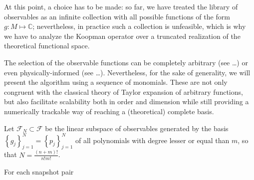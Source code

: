 \documentclass{article}
\begin{document}
        At this point, a choice has to be made: so far, we have treated the library of observables as an infinite collection with all possible functions of the form $g:M \mapsto \mathbb{C}$; nevertheless, in practice such a collection is unfeasible, which is why we have to analyze the Koopman operator over a truncated realization of the theoretical functional space.

        The selection of the observable functions can be completely arbitrary (see \dots) or even physically-informed (see \dots). Nevertheless, for the sake of generality, we will present the algorithm using a sequence of monomials. These are not only congruent with the classical theory of Taylor expansion of arbitrary functions, but also facilitate scalability both in order and dimension while still providing a numerically trackable way of reaching a (theoretical) complete basis.

        Let $\mathcal{F}_N \subset \mathcal{F}$ be the linear subspace of observables generated by the basis $\left\{g_j\right\}_{j=1}^{N} = \left\{p_j\right\}_{j=1}^{N}$ of all polynomials with degree lesser or equal than $m$, so that $N = \frac{(n+m)!}{n!m!}$.

        For each snapshot pair

    
\end{document}

